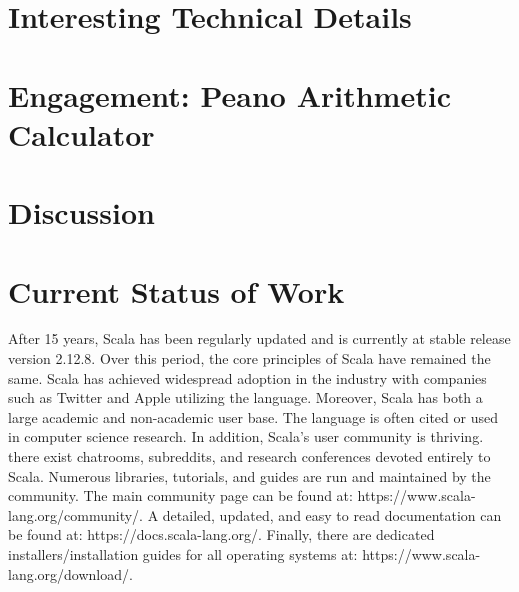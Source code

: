 \documentclass[jou,apacite]{IEEEtran}
\begin{document}
\section{Interesting Technical Details}
\label{sec:interesting-tech}

\subsection{}








\section{Engagement: Peano Arithmetic Calculator}
\label{sec:engag-peano-arithm}

\section{Discussion}
\label{sec:discussion}

\section{Current Status of Work}
After 15 years, Scala has been regularly updated and is currently at stable
release version 2.12.8. Over this period, the core principles of Scala have
remained the same. Scala has achieved widespread adoption in the industry with
companies such as Twitter and Apple utilizing the language. Moreover, Scala has
both a large academic and non-academic user base. The language is often cited or
used in computer science research. In addition, Scala's user community is
thriving. there exist chatrooms, subreddits, and research conferences devoted
entirely to Scala. Numerous libraries, tutorials, and guides are run and
maintained by the community. The main community page can be found at:
https://www.scala-lang.org/community/. A detailed, updated, and easy to read
documentation can be found at: https://docs.scala-lang.org/. Finally, there are
dedicated installers/installation guides for all operating systems at:
https://www.scala-lang.org/download/.




\end{document}

